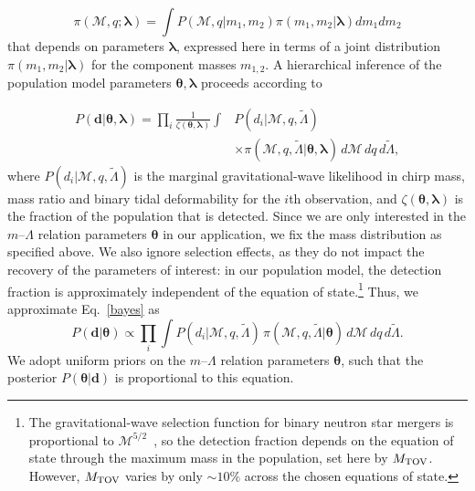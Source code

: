 \documentclass[aps,prd,twocolumn,superscriptaddress,nofootinbib]{revtex4-1}
\begin{document}
\begin{equation}
    \pi(\mathcal{M},q;\boldsymbol{\lambda}) = \int P(\mathcal{M},q|m_1,m_2) \pi(m_1,m_2|\boldsymbol{\lambda}) dm_1 dm_2
\end{equation}
that depends on parameters $\boldsymbol{\lambda}$, expressed here in terms of a joint distribution $\pi(m_1,m_2|\boldsymbol{\lambda})$ for the component masses $m_{1,2}$. A hierarchical inference of the population model parameters $\boldsymbol{\theta}, \boldsymbol{\lambda}$ proceeds according to~\cite{MandelFarr2019}

\begin{align} \label{bayes}
    P(\boldsymbol{d}|\boldsymbol{\theta},\boldsymbol{\lambda}) = \prod_i \frac{1}{\zeta(\boldsymbol{\theta},\boldsymbol{\lambda})} \int& P(d_i | \mathcal{M},q,\tilde{\Lambda}) \nonumber \\ 
    &\times \pi(\mathcal{M},q,\tilde{\Lambda} | \boldsymbol{\theta},\boldsymbol{\lambda}) \,d\mathcal{M}\, dq\, d\tilde{\Lambda} ,
\end{align}
where $P(d_i|\mathcal{M},q,\tilde{\Lambda})$ is the marginal gravitational-wave likelihood in chirp mass, mass ratio and binary tidal deformability for the $i$th observation, and $\zeta(\boldsymbol{\theta},\boldsymbol{\lambda})$ is the fraction of the population that is detected. Since we are only interested in the $m$--$\Lambda$ relation parameters $\boldsymbol{\theta}$ in our application, we fix the mass distribution as specified above. We also ignore selection effects, as they do not impact the recovery of the parameters of interest: in our population model, the detection fraction is approximately independent of the equation of state.\footnote{The gravitational-wave selection function for binary neutron star mergers is proportional to $\mathcal{M}^{5/2}$~\cite{ChatziioannouFarr2020}, so the detection fraction depends on the equation of state through the maximum mass in the population, set here by $M_{\rm TOV}$. However, $M_{\rm TOV}$ varies by only $\sim 10\%$ across the chosen equations of state.}
Thus, we approximate Eq.~\eqref{bayes} as
\begin{equation}
    P(\boldsymbol{d}|\boldsymbol{\theta}) \propto \prod_i \int P(d_i | \mathcal{M},q,\tilde{\Lambda}) \, \pi(\mathcal{M},q,\tilde{\Lambda} | \boldsymbol{\theta}) \, d\mathcal{M} \, dq \, d\tilde{\Lambda} .
\end{equation}
We adopt uniform priors on the $m$--$\Lambda$ relation parameters $\boldsymbol{\theta}$, such that the posterior $P(\boldsymbol{\theta}|\boldsymbol{d})$ is proportional to this equation.
\end{document}
